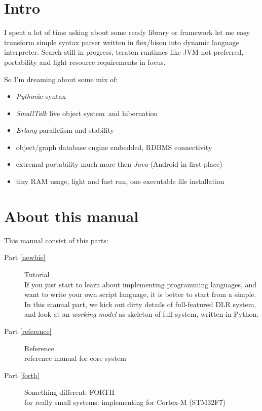 \clearpage
\section{Intro}%

I spent a lot of time asking about some ready library or framework let me easy
transform simple syntax parser written in flex/bison into dynamic language
interpreter. Search still in progress, teraton runtimes like JVM not preferred,
portability and light resource requirements in focus.

\bigskip
So I'm dreaming about some mix of:
\begin{itemize}[nosep]
  \item \emph{Python}ic syntax 
  \item \emph{SmallTalk} live object system\ and
  hibernation
  \item \emph{Erlang} parallelism and stability
  \item object/graph database engine embedded, RDBMS connectivity
  \item extremal portability much more then \emph{Java} (Android in first place)
  \item tiny RAM usage, light and fast run, one executable file installation
\end{itemize} 

\section{About this manual}%

This manual consist of this parts:
\begin{description}
\item[Part \ref{newbie}] Tutorial\\
If you just start to learn about implementing programming languages, and want to
write your own script language, it is better to start from a simple. In this
manual part, we kick out dirty details of full-featured DLR system, and look at
an \emph{working model} as skeleton of full system, written in Python.
\item[Part \ref{reference}] Reference\\reference manual for core system
\item[Part \ref{forth}] Something different: FORTH\\
for really small systems: implementing for Cortex-M (STM32F7) 
\end{description}
